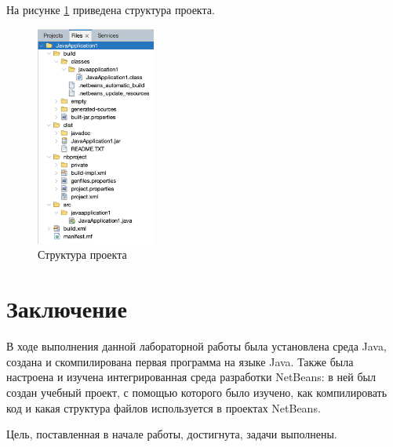 \documentclass[a4paper, 14pt]{extarticle}
\begin{document}
На рисунке \ref{fig:task-4-7} приведена структура проекта.

\begin{figure}[H]
  \centering
  \includegraphics[width=0.35\textwidth]{images/task-4/7.png}
  \caption{Структура проекта}
  \label{fig:task-4-7}
\end{figure}

\section*{Заключение}

В ходе выполнения данной лабораторной работы была установлена среда Java,
создана и скомпилирована первая программа на языке Java. Также была настроена и
изучена интегрированная среда разработки NetBeans: в ней был создан учебный
проект, с помощью которого было изучено, как компилировать код и какая структура
файлов используется в проектах NetBeans.

Цель, поставленная в начале работы, достигнута, задачи выполнены.
\end{document}
